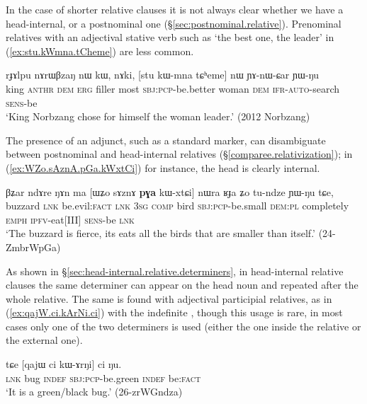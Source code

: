 In the case of shorter relative clauses it is not always clear whether we have a head-internal, or a postnominal one (§\ref{sec:postnominal.relative}). Prenominal relatives with an adjectival stative verb such as  `the best one, the leader' in (\ref{ex:stu.kWmna.tCheme}) are less common.


\begin{exe}
\ex \label{ex:stu.kWmna.tCheme}
\gll  rɟɤlpu nɤrɯβzaŋ nɯ kɯ, nɤki, [stu kɯ-mna tɕʰeme] nɯ ɲɤ-nɯ-ɕar ɲɯ-ŋu \\
king  \textsc{anthr} \textsc{dem} \textsc{erg} filler most \textsc{sbj}:\textsc{pcp}-be.better woman \textsc{dem} \textsc{ifr}-\textsc{auto}-search \textsc{sens}-be \\
\glt `King Norbzang chose for himself the woman leader.' (2012 Norbzang)
\end{exe} 


The presence of an adjunct, such as a standard marker, can disambiguate between postnominal and head-internal relatives (§\ref{comparee.relativization}); in (\ref{ex:WZo.sAznA.pGa.kWxtCi}) for instance, the head  is clearly internal.

\begin{exe}
\ex \label{ex:WZo.sAznA.pGa.kWxtCi}
\gll βʑar ndɤre ŋɤn ma [ɯʑo sɤznɤ \textbf{pɣa} kɯ-xtɕi] nɯra ʁɟa ʑo tu-ndze ɲɯ-ŋu tɕe, \\
buzzard \textsc{lnk} be.evil:\textsc{fact} \textsc{lnk} \textsc{3sg} \textsc{comp} bird \textsc{sbj}:\textsc{pcp}-be.small \textsc{dem}:\textsc{pl} completely \textsc{emph}  \textsc{ipfv}-eat[III] \textsc{sens}-be \textsc{lnk} \\
\glt `The buzzard is fierce, its eats all the birds that are smaller than itself.' (24-ZmbrWpGa)
\end{exe}

As shown in §\ref{sec:head-internal.relative.determiners}, in head-internal relative clauses the same determiner can appear on the head noun and repeated after the whole relative. The same is found with adjectival participial relatives, as in (\ref{ex:qajW.ci.kArNi.ci}) with the indefinite , though this usage is rare, in most cases only one of the two determiners is used (either the one inside the relative or the external one).

\begin{exe}
\ex \label{ex:qajW.ci.kArNi.ci}
\gll tɕe [qajɯ ci kɯ-ɤrŋi] ci ŋu. \\
\textsc{lnk} bug \textsc{indef} \textsc{sbj}:\textsc{pcp}-be.green \textsc{indef} be:\textsc{fact} \\
\glt `It is a green/black bug.' (26-zrWGndza)
\end{exe}

